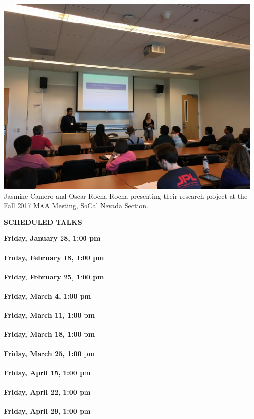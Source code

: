 \documentclass[a4paper]{article}
\begin{document}
\begin{minipage}{0.95\textwidth}
\begin{minipage}[b]{0.47\textwidth}
\rule{0pt}{32pt}
\end{minipage}\hspace{5pt}
\begin{minipage}[b]{0.47\textwidth}
\includegraphics[width=\linewidth, trim = {0 0 0 25cm}, clip]{Oscar.jpg}
Jasmine Camero and Oscar Rocha Rocha presenting their research project at the Fall 2017 MAA Meeting, SoCal Nevada Section.
\medskip
\medskip

{\large\raggedright
{\textbf{\color{csecondary}SCHEDULED TALKS}}
}\par
\normalsize
\smallskip


{\leavevmode \raggedright
\textbf{\color{cprimary}Friday, January 28, 1:00 pm}\\ \\
\textbf{\color{cprimary}Friday, February 18, 1:00 pm}\\ \\
\textbf{\color{cprimary}Friday, February 25, 1:00 pm}\\ \\
\textbf{\color{cprimary}Friday, March 4, 1:00 pm}\\ \\
\textbf{\color{cprimary}Friday, March 11, 1:00 pm}\\ \\
\textbf{\color{cprimary}Friday, March 18, 1:00 pm}\\ \\
\textbf{\color{cprimary}Friday, March 25, 1:00 pm}\\ \\
\textbf{\color{cprimary}Friday, April 15, 1:00 pm}\\ \\
\textbf{\color{cprimary}Friday, April 22, 1:00 pm}\\ \\
\textbf{\color{cprimary}Friday, April 29, 1:00 pm}\\ \\
\par{}
}


\end{minipage}
\end{minipage}
\end{document}
